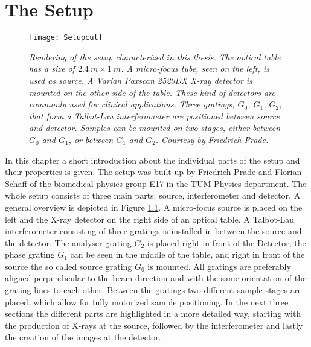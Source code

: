 \chapter{The Setup}\label{chap:setup}

\begin{figure}[h]
	\begin{center}
		\texttt{[image: Setupcut]}
	\end{center}
	\caption[Schematic rendering of the whole setup]{\textit{Rendering of the setup characterized in this thesis. The optical table has a size of $2.4\ m \times 1\ m$. A micro-focus tube, seen on the left, is used as source. A Varian Paxscan 2520DX X-ray detector is mounted on the other side of the table. These kind of detectors are commonly used for clinical applications. Three gratings, $G_{0}$, $G_{1}$, $G_{2}$, that form a Talbot-Lau interferometer are positioned between source and detector. Samples can be mounted on two stages, either between $G_{0}$ and $G_{1}$, or between $G_{1}$ and $G_{2}$. Courtesy by Friedrich Prade.}} 
	\label{setup}
\end{figure}

\newpage
In this chapter a short introduction about the individual parts of the setup and their properties is given. The setup was built up by Friedrich Prade and Florian Schaff of the biomedical physics group E17 in the TUM Physics department. The whole setup consists of three main parts: source, interferometer and detector. A general overview is depicted in Figure \ref{setup}. A micro-focus source is placed on the left and the X-ray detector on the right side of an optical table. A Talbot-Lau interferometer consisting of three gratings is installed in between the source and the detector. The analyser grating $G_{2}$ is placed right in front of the Detector, the phase grating $G_{1}$ can be seen in the middle of the table, and right in front of the source the so called source grating $G_{0}$ is mounted. All gratings are preferably aligned perpendicular to the beam direction and with the same orientation of the grating-lines to each other. Between the gratings two different sample stages are placed, which allow for fully motorized sample positioning. In the next three sections the different parts are highlighted in a more detailed way, starting with the production of X-rays at the source, followed by the interferometer and lastly the creation of the images at the detector. 
